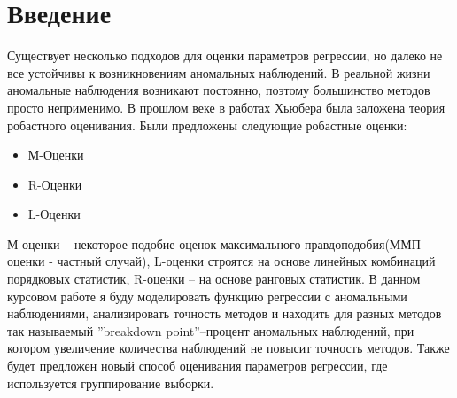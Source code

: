 \documentclass[12pt]{article}
\begin{document}
\section{Введение}
Существует несколько подходов для оценки параметров регрессии, но далеко не все устойчивы к возникновениям аномальных наблюдений.
В реальной жизни аномальные наблюдения возникают постоянно, поэтому большинство методов просто неприменимо.
В прошлом веке в работах Хьюбера была заложена теория робастного оценивания.\hfill\break
Были предложены следующие робастные оценки\cite{Huber}:\hfill\break
\begin{itemize}
    \item М-Оценки\\
    \item R-Оценки\\
    \item L-Оценки
\end{itemize}
М-оценки -- некоторое подобие оценок максимального правдоподобия(ММП-оценки - частный случай), L-оценки строятся на основе линейных комбинаций порядковых статистик, R-оценки -- на основе ранговых статистик.
В данном курсовом работе я буду моделировать функцию регрессии с аномальными наблюдениями, анализировать точность методов и находить для разных методов так называемый ''breakdown point''--процент аномальных наблюдений, при котором увеличение количества наблюдений не повысит точность методов.\hfill\break
Также будет предложен новый способ оценивания параметров регрессии, где используется группирование выборки.

\newpage
\end{document}
